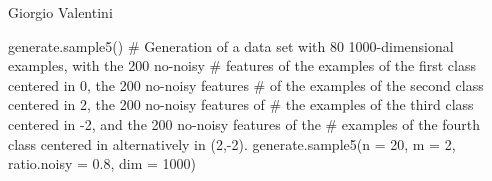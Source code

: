 \documentclass{article}
\begin{document}
\begin{Author}\relax
Giorgio Valentini 
\end{Author}
\begin{Examples}
\begin{ExampleCode}
generate.sample5()
# Generation of a data set with 80 1000-dimensional examples, with the 200 no-noisy 
# features of the examples of the first class  centered in 0, the 200 no-noisy features 
# of the examples of the second class  centered in 2, the 200 no-noisy features of 
# the examples of the third class  centered in -2, and the 200 no-noisy features of the 
# examples of the fourth class  centered in alternatively in (2,-2).
generate.sample5(n = 20, m = 2, ratio.noisy = 0.8, dim = 1000)
\end{ExampleCode}
\end{Examples}
\end{document}
